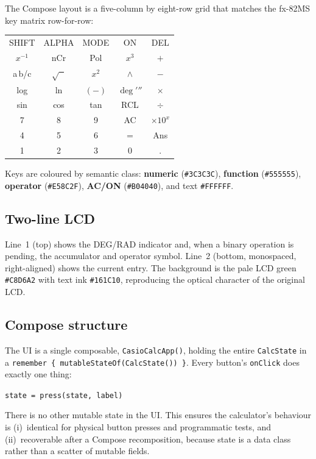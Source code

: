 \documentclass[11pt,a4paper]{article}
\begin{document}
The Compose layout is a five-column by eight-row grid that matches the fx-82MS key matrix row-for-row:

\begin{center}
\begin{tabular}{@{}c|c|c|c|c@{}}
\toprule
SHIFT & ALPHA & MODE & ON & DEL \\
$x^{-1}$ & nCr & Pol & $x^3$ & $+$ \\
a\,b/c & $\sqrt{\phantom{x}}$ & $x^2$ & $\wedge$ & $-$ \\
log & ln & $(-)$ & $\deg'\!''$ & $\times$ \\
sin & cos & tan & RCL & $\div$ \\
7 & 8 & 9 & AC & $\times10^x$ \\
4 & 5 & 6 & = & Ans \\
1 & 2 & 3 & 0 & . \\
\bottomrule
\end{tabular}
\end{center}

Keys are coloured by semantic class:
\textbf{numeric} (\texttt{\#3C3C3C}), \textbf{function} (\texttt{\#555555}), \textbf{operator} (\texttt{\#E58C2F}),
\textbf{AC/ON} (\texttt{\#B04040}), and text \texttt{\#FFFFFF}.

\subsection{Two-line LCD}

Line~1 (top) shows the DEG/RAD indicator and, when a binary operation is pending, the accumulator and operator symbol. Line~2 (bottom, monospaced, right-aligned) shows the current entry. The background is the pale LCD green \texttt{\#C8D6A2} with text ink \texttt{\#161C10}, reproducing the optical character of the original LCD.

\subsection{Compose structure}

The UI is a single composable, \texttt{CasioCalcApp()}, holding the entire \texttt{CalcState} in a \texttt{remember \{ mutableStateOf(CalcState()) \}}. Every button's \texttt{onClick} does exactly one thing:
\begin{center}
\texttt{state = press(state, label)}
\end{center}
There is no other mutable state in the UI. This ensures the calculator's behaviour is (i)~identical for physical button presses and programmatic tests, and (ii)~recoverable after a Compose recomposition, because state is a data class rather than a scatter of mutable fields.
\end{document}
